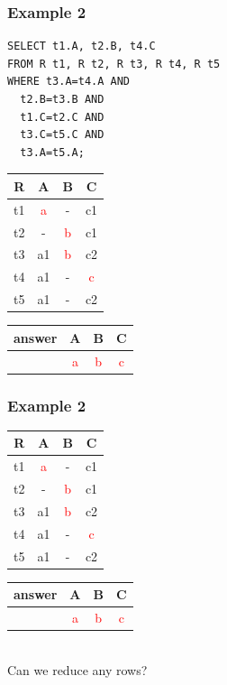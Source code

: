 \documentclass{beamer}
\begin{document}
\begin{frame}[fragile]
  \frametitle{Example 2}
\begin{verbatim}  
SELECT t1.A, t2.B, t4.C
FROM R t1, R t2, R t3, R t4, R t5
WHERE t3.A=t4.A AND
  t2.B=t3.B AND
  t1.C=t2.C AND
  t3.C=t5.C AND
  t3.A=t5.A;
\end{verbatim} 
  \begin{tabular}{ c | c c c}
  R & A & B & C \\
  \hline
  t1 & \textcolor{red}{a}  & -  & c1 \\
  t2 & -  & \textcolor{red}{b}  & c1 \\
  t3 & a1 & \textcolor{red}{b} & c2 \\
  t4 & a1 & - & \textcolor{red}{c} \\
  t5 & a1 & - & c2 \\
  \end{tabular}
  \begin{tabular}{ c | c c c}
  answer & A & B & C \\
  \hline
   & \textcolor{red}{a}& \textcolor{red}{b}& \textcolor{red}{c}\\
  \end{tabular}
\end{frame}

\begin{frame}
  \frametitle{Example 2}
  \begin{tabular}{ c | c c c}
  R & A & B & C \\
  \hline
  t1 & \textcolor{red}{a}  & -  & c1 \\
  t2 & -  & \textcolor{red}{b}  & c1 \\
  t3 & a1 & \textcolor{red}{b} & c2 \\
  t4 & a1 & - & \textcolor{red}{c} \\
  t5 & a1 & - & c2 \\
  \end{tabular}
  \begin{tabular}{ c | c c c}
  answer & A & B & C \\
  \hline
   & \textcolor{red}{a}& \textcolor{red}{b}& \textcolor{red}{c}\\
  \end{tabular}
  \hfill \\
  Can we reduce any rows?
\end{frame}
\end{document}
